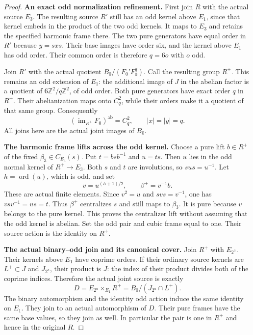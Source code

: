 \begin{proof}
\par\medskip\noindent\textbf{An exact odd normalization refinement.}\quad
First join $R$ with the actual source $E_3$. The resulting
source $R'$ still has an odd kernel above $E_1$, since that
kernel embeds in the product of the two odd kernels. It
maps to $E_3$ and retains the specified harmonic frame there.
The two pure generators have equal order in $R'$ because
$y=sxs$. Their base images have order six, and the kernel
above $E_1$ has odd order. Their common order is therefore
$q=6o$ with $o$ odd.

Join $R'$ with the actual quotient $B_0/(F_0'F_0^q)$.
Call the resulting group $R^+$. This remains an odd
extension of $E_1$: the additional image of $J$ in the
abelian factor is a quotient of
$6\mathbb Z^2/q\mathbb Z^2$, of odd order.
Both pure generators have exact order $q$ in $R^+$.
Their abelianization maps onto $C_q^2$, while their orders
make it a quotient of that same group. Consequently
\[
                 (\operatorname{im}_{R^+}F_0)^{\mathrm{ab}}=C_q^2,
                 \qquad |x|=|y|=q.
                                                        \tag{OJB.2}
\]
All joins here are the actual joint images of $B_0$.

\par\medskip\noindent\textbf{The harmonic frame lifts across the odd kernel.}\quad
Choose a pure lift $b\in R^+$ of the fixed
$\beta_3\in C_{E_3}(s)$. Put $t=bsb^{-1}$ and $u=ts$.
Then $u$ lies in the odd normal kernel of $R^+\to E_3$.
Both $s$ and $t$ are involutions, so $sus=u^{-1}$.
Let $h=\operatorname{ord}(u)$, which is odd, and set
\[
                  v=u^{(h+1)/2},\qquad \beta^+=v^{-1}b.
                                                        \tag{OJB.3}
\]
These are actual finite elements. Since $v^2=u$ and
$svs=v^{-1}$, one has $vsv^{-1}=us=t$.
Thus $\beta^+$ centralizes $s$ and still maps to
$\beta_3$. It is pure because $v$ belongs to the pure
kernel. This proves the centralizer lift without assuming
that the odd kernel is abelian.
Set the odd pair and cubic frame equal to one. Their
source action is the identity on $R^+$.

\par\medskip\noindent\textbf{The actual binary--odd join and its canonical cover.}\quad
Join $R^+$ with $E_{2^a}$. Their kernels above $E_1$ have
coprime orders. If their ordinary source kernels are
$L^+\subset J$ and $J_{2^a}$, their product is $J$:
the index of their product divides both of the coprime
indices. Therefore the actual joint source is exactly
\[
 D=E_{2^a}\mathbin{\times}_{E_1}R^+
      =B_0/(J_{2^a}\cap L^+).
                                                        \tag{OJB.4}
\]
The binary automorphism and the identity odd action
induce the same identity on $E_1$. They join to an actual
automorphism of $D$. Their pure frames have the same
base values, so they join as well. In particular the
pair is one in $R^+$ and hence in the original $R$.


\end{proof}
